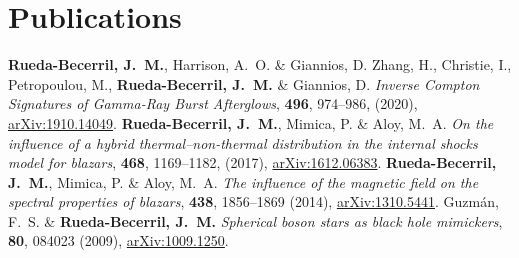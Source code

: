 \section{Publications}

\renewcommand{\refname}{Articles}
\setcounter{num}{0}
\renewcommand{\MyNbOfPub}{5}
\renewcommand*{\bibliographyitemlabel}{[\arabic{enumiv}]}
\begin{thebibliography}{99}
   \textbf{Rueda-Becerril, J.~M.}, Harrison, A.~O. \& Giannios, D. %
   Zhang, H., Christie, I., Petropoulou, M., \textbf{Rueda-Becerril, J.~M.} \& Giannios, D. \textit{Inverse Compton Signatures of Gamma-Ray Burst Afterglows}, \href{https://doi.org/10.1093/mnras/staa1583}{\mnras} \textbf{496}, 974--986, (2020), \href{https://arxiv.org/abs/1910.14049}{arXiv:1910.14049}.
   \textbf{Rueda-Becerril, J.~M.}, Mimica, P. \& Aloy, M.~A. \textit{On the influence of a hybrid thermal--non-thermal distribution in the internal shocks model for blazars}, \href{https://doi.org/10.1093/mnras/stx476}{\mnras} \textbf{468}, 1169--1182, (2017), \href{https://arxiv.org/abs/1612.06383}{arXiv:1612.06383}.
   \textbf{Rueda-Becerril, J.~M.}, Mimica, P. \& Aloy, M.~A. \textit{The influence of the magnetic field on the spectral properties of blazars}, \href{https://doi.org/10.1093/mnras/stt2335}{\mnras} \textbf{438}, 1856--1869 (2014), \href{https://arxiv.org/abs/1310.5441}{arXiv:1310.5441}.
   Guzmán, F.~S. \& \textbf{Rueda-Becerril, J.~M.} \textit{Spherical boson stars as black hole mimickers},  \href{https://doi.org/10.1103/PhysRevD.80.084023}{\prd} \textbf{80}, 084023 (2009), \href{https://arxiv.org/abs/1009.1250}{arXiv:1009.1250}.
\end{thebibliography}

